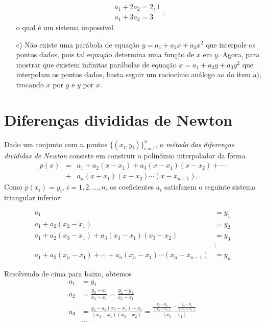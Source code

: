 \begin{Answer}
\begin{tiny}
\begin{itemize}
\begin{equation*}
\begin{split}
    a_1 + 2a_2 = 2,1\\
    a_1 + 3a_2 = 3      
    \end{split},
  \end{equation*}
o qual é um sistema impossível.
\item[c)] Não existe uma parábola de equação $y = a_1 + a_2x + a_3x^2$ que interpole os pontos dados, pois tal equação determina uma função de $x$ em $y$. Agora, para mostrar que existem infinitas parábolas de equação $x = a_1 + a_2y + a_3y^2$ que interpolam os pontos dados, basta seguir um raciocínio análogo ao do item a), trocando $x$ por $y$ e $y$ por $x$.
  \end{itemize}
  \end{tiny}
\end{Answer}


\section{Diferenças divididas de Newton}
Dado um conjunto com $n$ pontos $\{(x_i, y_i)\}_{i=1}^n$, o \emph{método das diferenças divididas de Newton} consiste em construir o polinômio interpolador da forma
\begin{eqnarray*}
p(x) &=& a_1 + a_2 (x-x_1) + a_3 (x-x_1)(x-x_2) + \cdots \\
     &+& a_n (x-x_1)(x-x_2)\cdots (x-x_{n-1}).
\end{eqnarray*}
Como $p(x_i) = y_i$, $i=1, 2, \dotsc, n$, os coeficientes $a_i$ satisfazem o seguinte sistema triangular inferior:
\begin{small}
  \begin{equation*}
    \begin{array}{ll}
a_1               &= y_1\\
a_1+a_2(x_2-x_1)  &= y_2\\
a_1+a_2(x_3-x_1)+a_3(x_3-x_1)(x_3-x_2) &= y_3\\
&\vdots\\
a_1+a_2(x_n-x_1)+\cdots + a_n(x_n-x_1)\cdots (x_n-x_{n-1}) &= y_n
    \end{array}
  \end{equation*}
\end{small}
Resolvendo de cima para baixo, obtemos
\begin{equation*}\label{eq:coef_dif_div}
  \begin{split}
a_1&=y_1\\
a_2&=\frac{y_2-a_1}{x_2-x_1}=\frac{y_2-y_1}{x_2-x_1}\\
a_3&=\frac{y_3-a_2(x_3-x_1)-a_1}{(x_3-x_1)(x_3-x_2)}=\frac{\frac{y_3-y_2}{(x_3-x_2)}-\frac{y_2-y_1}{(x_2-x_1)}}{(x_3-x_1)}\\
&\ldots    
  \end{split}
\end{equation*}

